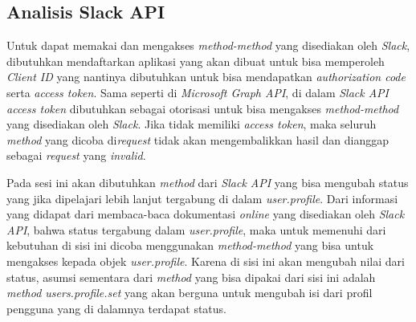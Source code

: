 \subsection{Analisis Slack API}
Untuk dapat memakai dan mengakses \textit{method-method} yang disediakan oleh \textit{Slack}, dibutuhkan mendaftarkan aplikasi yang akan dibuat untuk bisa memperoleh \textit{Client ID} yang nantinya dibutuhkan untuk bisa mendapatkan \textit{authorization code} serta \textit{access token}. Sama seperti di \textit{Microsoft Graph API}, di dalam \textit{Slack API access token} dibutuhkan sebagai otorisasi untuk bisa mengakses \textit{method-method} yang disediakan oleh \textit{Slack}. Jika tidak memiliki \textit{access token}, maka seluruh \textit{method} yang dicoba di\textit{request} tidak akan mengembalikkan hasil dan dianggap sebagai \textit{request} yang \textit{invalid}. 

Pada sesi ini akan dibutuhkan \textit{method} dari \textit{Slack API} yang bisa mengubah status yang jika dipelajari lebih lanjut tergabung di dalam \textit{user.profile}. Dari informasi yang didapat dari membaca-baca dokumentasi \textit{online} yang disediakan oleh \textit{Slack API}, bahwa status tergabung dalam \textit{user.profile}, maka untuk memenuhi dari kebutuhan di sisi ini dicoba menggunakan \textit{method-method} yang bisa untuk mengakses kepada objek \textit{user.profile}. Karena di sisi ini akan mengubah nilai dari status, asumsi sementara dari \textit{method} yang bisa dipakai dari sisi ini adalah \textit{method users.profile.set} yang akan berguna untuk mengubah isi dari profil pengguna yang di dalamnya terdapat status. 

